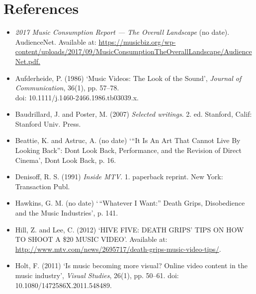 \documentclass[a4paper, 11pt]{article}
\begin{document}
\section*{References}\label{header-n2}
\begin{itemize}
	\item[] \emph{2017 Music Consumption Report --- The Overall Landscape} (no date). AudienceNet. Available at: \url{https://musicbiz.org/wp-content/uploads/2017/09/MusicConsumptionTheOverallLandscape/AudienceNet.pdf.}


	\item[] Aufderheide, P. (1986) ‘Music Videos: The Look of the Sound’, \emph{Journal of Communication}, 36(1), pp. 57–78.\\ doi: 10.1111/j.1460-2466.1986.tb03039.x.



	\item[] Baudrillard, J. and Poster, M. (2007) \emph{Selected writings}. 2. ed. Stanford, Calif: Stanford Univ. Press.


    \item[] Beattie, K. and Astruc, A. (no date) ‘“It Is An Art That Cannot Live By Looking Back”: Dont Look Back, Performance, and the Revision of Direct Cinema’, Dont Look Back, p. 16.


	\item[] Denisoff, R. S. (1991) \emph{Inside MTV}. 1. paperback reprint. New
York: Transaction Publ.

%
	\item[] Hawkins, G. M. (no date) `\,``Whatever I Want:'' Death Grips,
Disobedience and the Music Industries', p. 141.



	\item[] Hill, Z. and Lee, C. (2012) `HIVE FIVE: DEATH GRIPS' TIPS ON HOW TO
SHOOT A \$20 MUSIC VIDEO'. Available at:
\url{http://www.mtv.com/news/2695717/death-grips-music-video-tips/}.


	\item[] Holt, F. (2011) `Is music becoming more visual? Online video content in
the music industry', \emph{Visual Studies}, 26(1), pp. 50--61. doi: 10.1080/1472586X.2011.548489.


\end{itemize}
\end{document}

